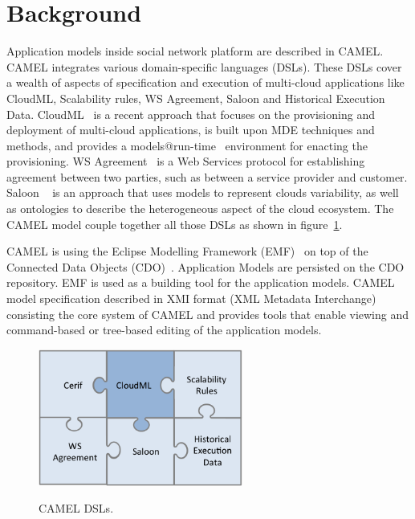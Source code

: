 \section{Background}
\label{sec:background}
Application models inside social network platform are described in CAMEL. CAMEL integrates various domain-specific languages (DSLs). These DSLs cover a wealth of aspects of specification and execution of multi-cloud applications like CloudML, Scalability rules, WS Agreement, Saloon and Historical Execution Data. 
CloudML~\cite{FerryRossiniCMS13} is a recent approach that focuses on the provisioning and deployment of multi-cloud applications, is built upon MDE techniques and methods, and provides a models@run-time~\cite{models-runtime} environment for enacting the provisioning.  WS Agreement~\cite{andrieux2007web} is a Web Services protocol for establishing agreement between two parties, such as between a service provider and customer. Saloon ~\cite{quinton2013towards} is an approach that uses models to represent clouds variability, as well as ontologies to describe the heterogeneous aspect of the cloud ecosystem. The CAMEL model couple together all those DSLs as shown in figure~\ref{fig:dsls}.

CAMEL is using the Eclipse Modelling Framework (EMF)~\cite{steinberg2008emf} on top of the Connected Data Objects (CDO)~\cite{cdomodel}. Application Models are persisted on the CDO repository. EMF is used as a building tool for the application models. CAMEL model specification described in XMI format (XML Metadata Interchange) consisting the core system of CAMEL and provides tools that enable viewing and command-based or tree-based editing of the application models.

\begin{figure}[h]
	\caption{CAMEL DSLs.}
	\includegraphics[width=0.6\textwidth,natwidth=200,natheight=150]{./fig/dsl.png}
	\centering
	\label{fig:dsls}
\end{figure}

